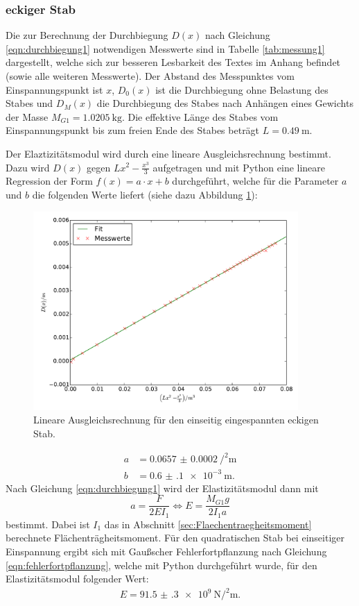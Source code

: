 \subsubsection{eckiger Stab}
Die zur Berechnung der Durchbiegung $D(x)$ nach Gleichung \eqref{eqn:durchbiegung1}
notwendigen Messwerte sind in Tabelle \ref{tab:messung1} dargestellt, welche sich
zur besseren Lesbarkeit des Textes im Anhang befindet (sowie alle weiteren Messwerte).\newline
Der Abstand des Messpunktes vom Einspannungspunkt ist $x$, $D_0(x)$ ist die
Durchbiegung ohne Belastung des Stabes und $D_M(x)$ die Durchbiegung des Stabes
nach Anhängen eines Gewichts der Masse $M_{G1} = \SI{1.0205}{\kilo\gram}$. Die
effektive Länge des Stabes vom Einspannungspunkt bis zum freien Ende des Stabes
beträgt $L = \SI{0.49}{\meter}$.

Der Elaztizitätsmodul wird durch eine lineare Ausgleichsrechnung bestimmt. Dazu
wird $D(x)$ gegen $L x^2 - \frac{x^3}{3}$ aufgetragen und mit Python eine lineare
Regression der Form $f(x) = a \cdot x + b$ durchgeführt, welche für die Parameter
$a$ und $b$ die folgenden Werte liefert (siehe dazu Abbildung
\ref{fig:plot_einseitig1}):
\begin{figure}
  \centering
  \includegraphics[width=0.9\textwidth]{stab1_einseitig.pdf}
  \caption{Lineare Ausgleichsrechnung für den einseitig eingespannten eckigen Stab.}
  \label{fig:plot_einseitig1}
\end{figure}
\begin{align*}
  a &= \SI{0.0657(2)}{\per\squared\meter} \\
  b &= \SI{0.6(1)e-3}{\meter}.
\end{align*}
Nach Gleichung \eqref{eqn:durchbiegung1} wird der Elastizitätsmodul dann mit
\begin{equation}
  a = \frac{F}{2 E I_1} \iff E = \frac{M_{G1} g}{2 I_1 a}
  \label{eqn:Emodul1}
\end{equation}
bestimmt. Dabei ist $I_1$ das in Abschnitt \ref{sec:Flaechentraegheitsmoment}
berechnete Flächenträgheitsmoment. Für den quadratischen Stab bei einseitiger
Einspannung ergibt sich mit Gaußscher Fehlerfortpflanzung nach Gleichung
\eqref{eqn:fehlerfortpflanzung}, welche mit Python durchgeführt wurde, für den
Elastizitätsmodul folgender Wert:
\begin{align*}
  E = \SI{91.5(3)e+9}{\newton\per\squared\meter}.
\end{align*}


